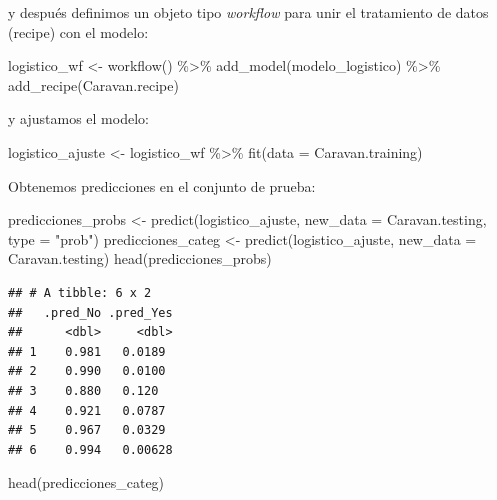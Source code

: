 \documentclass[
  12pt,
]{book}
\newenvironment{Shaded}{\begin{snugshade}}{\end{snugshade}}
\newcommand{\AttributeTok}[1]{\textcolor[rgb]{0.77,0.63,0.00}{#1}}
\newcommand{\FunctionTok}[1]{\textcolor[rgb]{0.00,0.00,0.00}{#1}}
\newcommand{\NormalTok}[1]{#1}
\newcommand{\OtherTok}[1]{\textcolor[rgb]{0.56,0.35,0.01}{#1}}
\newcommand{\SpecialCharTok}[1]{\textcolor[rgb]{0.00,0.00,0.00}{#1}}
\newcommand{\StringTok}[1]{\textcolor[rgb]{0.31,0.60,0.02}{#1}}
\theoremstyle{definition}
\theoremstyle{definition}
\theoremstyle{definition}
\theoremstyle{definition}
\theoremstyle{remark}
\begin{document}
y después definimos un objeto tipo \emph{workflow} para unir el tratamiento de datos (recipe) con el modelo:

\begin{Shaded}
\begin{Highlighting}[]
\NormalTok{logistico\_wf }\OtherTok{\textless{}{-}} \FunctionTok{workflow}\NormalTok{() }\SpecialCharTok{\%\textgreater{}\%}
    \FunctionTok{add\_model}\NormalTok{(modelo\_logistico) }\SpecialCharTok{\%\textgreater{}\%}
    \FunctionTok{add\_recipe}\NormalTok{(Caravan.recipe)}
\end{Highlighting}
\end{Shaded}

y ajustamos el modelo:

\begin{Shaded}
\begin{Highlighting}[]
\NormalTok{logistico\_ajuste }\OtherTok{\textless{}{-}}\NormalTok{ logistico\_wf }\SpecialCharTok{\%\textgreater{}\%}
    \FunctionTok{fit}\NormalTok{(}\AttributeTok{data =}\NormalTok{ Caravan.training)}
\end{Highlighting}
\end{Shaded}

Obtenemos predicciones en el conjunto de prueba:

\begin{Shaded}
\begin{Highlighting}[]
\NormalTok{predicciones\_probs }\OtherTok{\textless{}{-}} \FunctionTok{predict}\NormalTok{(logistico\_ajuste, }\AttributeTok{new\_data =}\NormalTok{ Caravan.testing,}
    \AttributeTok{type =} \StringTok{"prob"}\NormalTok{)}
\NormalTok{predicciones\_categ }\OtherTok{\textless{}{-}} \FunctionTok{predict}\NormalTok{(logistico\_ajuste, }\AttributeTok{new\_data =}\NormalTok{ Caravan.testing)}
\FunctionTok{head}\NormalTok{(predicciones\_probs)}
\end{Highlighting}
\end{Shaded}

\begin{verbatim}
## # A tibble: 6 x 2
##   .pred_No .pred_Yes
##      <dbl>     <dbl>
## 1    0.981   0.0189 
## 2    0.990   0.0100 
## 3    0.880   0.120  
## 4    0.921   0.0787 
## 5    0.967   0.0329 
## 6    0.994   0.00628
\end{verbatim}

\begin{Shaded}
\begin{Highlighting}[]
\FunctionTok{head}\NormalTok{(predicciones\_categ)}
\end{Highlighting}
\end{Shaded}
\end{document}
